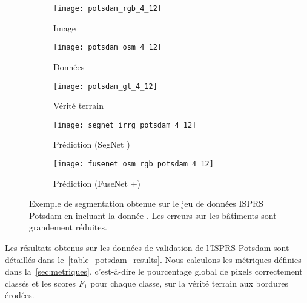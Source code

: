 \begin{figure}[h]
\begin{subfigure}{0.33\linewidth}
	\texttt{[image: potsdam\_rgb\_4\_12]}
    \caption{Image }
\end{subfigure}
\hfill
\begin{subfigure}{0.33\linewidth}
    \texttt{[image: potsdam\_osm\_4\_12]}
    \caption{Données }
\end{subfigure}
\hfill
\begin{subfigure}{0.33\linewidth}
	\texttt{[image: potsdam\_gt\_4\_12]}
    \caption{Vérité terrain}
\end{subfigure}
\begin{subfigure}{0.49\linewidth}
	\texttt{[image: segnet\_irrg\_potsdam\_4\_12]}
    \caption{Prédiction (SegNet )}
\end{subfigure}
\hfill
\begin{subfigure}{0.49\linewidth}
	\texttt{[image: fusenet\_osm\_rgb\_potsdam\_4\_12]}
    \caption{Prédiction (FuseNet +)}
\end{subfigure}
\caption[Exemple de segmentation obtenue sur le jeu de données ISPRS Potsdam en incluant la donnée .]{Exemple de segmentation obtenue sur le jeu de données ISPRS Potsdam en incluant la donnée . Les erreurs sur les bâtiments sont grandement réduites.\\\isprslegende}
\label{fig:potsdam_qualitative}
\end{figure}

Les résultats obtenus sur les données de validation de l'\gls{ISPRS} Potsdam sont détaillés dans le~\cref{table_potsdam_results}. Nous calculons les métriques définies dans la~\cref{sec:metriques}, c'est-à-dire le pourcentage global de pixels correctement classés et les scores $F_1$ pour chaque classe, sur la vérité terrain aux bordures érodées.

